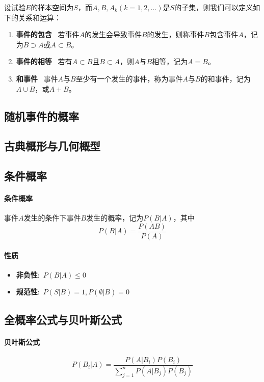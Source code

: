 \documentclass[UTF8]{ctexart}
\begin{document}
		设试验$E$的样本空间为$S$，而$A,B,A_k(k=1,2,\dots)$是$S$的子集，则我们可以定义如下的关系和运算：
		\begin{enumerate}
			\item \textbf{事件的包含} \ 若事件$A$的发生会导致事件$B$的发生，则称事件$B$包含事件$A$，记为$B \supset A$或$A \subset B$。
			\item \textbf{事件的相等} \ 若有$A \subset B$且$B \subset A$，则$A$与$B$相等，记为$A = B$。
			\item \textbf{和事件} \ 事件$A$与$B$至少有一个发生的事件，称为事件$A$与$B$的和事件，记为$A \cup B$，或$A + B$。
 		\end{enumerate}
		\subsection{随机事件的概率}
		\subsection{古典概形与几何概型}
		\subsection{条件概率}
		\paragraph{条件概率}事件$A$发生的条件下事件$B$发生的概率，记为$P(B|A)$，其中
		\[P(B|A) = \frac{P(AB)}{P(A)}\]
		\paragraph{性质}
		\begin{itemize}
			\item \textbf{非负性}:\ $P(B|A)\le 0$
			\item \textbf{规范性}:\ $P(S|B)=1,P(\emptyset|B)=0$
		\end{itemize}
		\subsection{全概率公式与贝叶斯公式}
		\paragraph{贝叶斯公式}
		\[P(B_i|A)=\frac{P(A|B_i)P(B_i)}{\sum^n_{j=1}P(A|B_j)P(B_j)}\]
		
		
\end{document}
